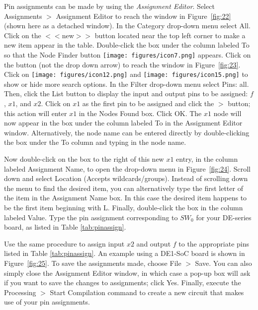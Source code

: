 Pin assignments can be made by using the {\it Assignment Editor}. 
Select {\sf Assignments $>$ Assignment Editor} to reach the window in Figure~\ref{fig:22}
(shown here as a detached window).
In the {\sf Category} drop-down menu select {\sf All}. Click on the {\sf $<$$<$new$>$$>$} button
located near the top left corner to make a new item appear in the table. Double-click the box
under the column labeled {\sf To} so that the {\sf Node Finder} button 
\texttt{[image: figures/icon7.png]}
appears. Click on the button (not the drop down arrow) to reach the window in 
Figure~\ref{fig:23}. Click on \texttt{[image: figures/icon12.png]} and 
\texttt{[image: figures/icon15.png]} to show or hide more search options.
In the {\sf Filter} drop-down menu select {\sf Pins: all}. Then, click the {\sf List} 
button to display the input and output pins to be assigned: $f$, $x1$, and $x2$.
Click on $x1$ as the first pin to be assigned and click the {\sf $>$} button; this action will 
enter $x1$ in the {\sf Nodes Found} box.  
Click {\sf OK}. The $x1$ node will now appear in the box 
under the column labeled {\sf To} in the Assignment Editor window. Alternatively, the node 
name can be entered directly by 
double-clicking the box under the {\sf To} column and typing in the node name.

Now double-click on the box to the right of this new $x1$ entry, in the column
labeled {\sf Assignment Name}, to open the drop-down menu in Figure~\ref{fig:24}. Scroll 
down and select {\sf Location (Accepts wildcards/groups)}. Instead of scrolling down the menu 
to find the desired item, you can alternatively type the first letter of the item in the 
{\sf Assignment Name} box. In this case the desired item happens to be the first item 
beginning with {\sf L}. Finally, double-click the box in the column labeled {\sf Value}.
Type the pin assignment corresponding to $SW_0$ for your DE-series board, as listed in 
Table \ref{tab:pinassign}.

Use the same procedure to assign input $x2$ and output $f$ to the appropriate pins listed in
Table \ref{tab:pinassign}. An example using a DE1-SoC board is shown in Figure~\ref{fig:25}.
To save the assignments made, choose {\sf File $>$ Save}. You can also simply close 
the Assignment Editor window, in which case a pop-up box will ask if you want to save
the changes to assignments; click {\sf Yes}. Finally, execute the {\sf Processing $>$ 
Start Compilation} command to create a new circuit that makes use of your pin assignments. 

